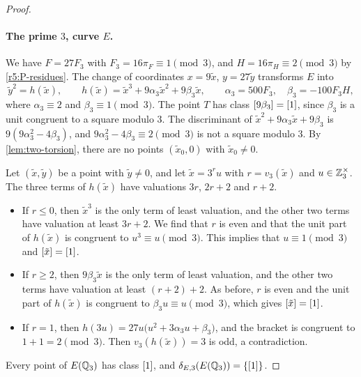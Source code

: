 \begin{proof}
\paragraph{The prime $3$, curve $E$.} We have $F=27F_3$ with $F_3=16\pi_F\equiv1\pmod3$, and $H=16\pi_H\equiv2\pmod3$ by \eqref{r5:P-residues}. The change of coordinates $x=9\tilde x$, $y=27\tilde y$ transforms $E$ into
\[
\tilde y^2=h(\tilde x),\qquad h(\tilde x)=\tilde x^3+9\alpha_3\tilde x^2+9\beta_3\tilde x,\qquad \alpha_3=500F_3,\quad \beta_3=-100F_3H,
\]
where $\alpha_3\equiv2$ and $\beta_3\equiv1\pmod3$. The point $T$ has class $[9\beta_3]=[1]$, since $\beta_3$ is a unit congruent to a square modulo $3$. The discriminant of $\tilde x^2+9\alpha_3\tilde x+9\beta_3$ is $9(9\alpha_3^2-4\beta_3)$, and $9\alpha_3^2-4\beta_3\equiv2\pmod3$ is not a square modulo $3$. By \cref{lem:two-torsion}, there are no points $(\tilde x_0,0)$ with $\tilde x_0\ne0$.

Let $(\tilde x,\tilde y)$ be a point with $\tilde y\ne0$, and let $\tilde x=3^ru$ with $r=v_3(\tilde x)$ and $u\in\mathbb Z_3^\times$. The three terms of $h(\tilde x)$ have valuations $3r$, $2r+2$ and $r+2$.
\begin{itemize}
\item If $r\le0$, then $\tilde x^3$ is the only term of least valuation, and the other two terms have valuation at least $3r+2$. We find that $r$ is even and that the unit part of $h(\tilde x)$ is congruent to $u^3\equiv u\pmod3$. This implies that $u\equiv1\pmod 3$ and $[\tilde x]=[1]$.
\item If $r\ge2$, then $9\beta_3\tilde x$ is the only term of least valuation, and the other two terms have valuation at least $(r+2)+2$. As before, $r$ is even and the unit part of $h(\tilde x)$ is congruent to $\beta_3u\equiv u\pmod3$, which gives $[\tilde x]=[1]$.
\item If $r=1$, then $h(3u)=27u\big(u^2+3\alpha_3u+\beta_3\big)$, and the bracket is congruent to $1+1=2\pmod3$. Then $v_3(h(\tilde x))=3$ is odd, a contradiction.
\end{itemize}
Every point of $E(\mathbb Q_3)$ has class $[1]$, and $\delta_{E,3}(E(\mathbb Q_3))=\{[1]\}$.


\end{proof}
